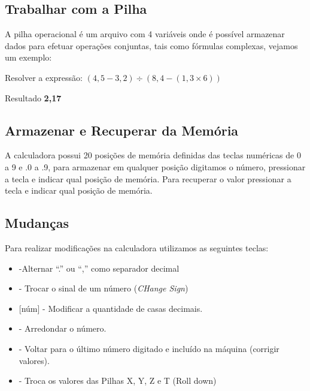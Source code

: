 \subsection*{Trabalhar com a Pilha}
A pilha operacional é um arquivo com 4 variáveis onde é possível armazenar dados para efetuar operações conjuntas, tais como fórmulas complexas, vejamos um exemplo:

Resolver a expressão: $(4,5 - 3,2) \div (8,4 - (1,3 \times 6))$

       \keystroke{$-$}          \keystroke{$\times$} \keystroke{$-$} \keystroke{$\div$}

Resultado \textbf{2,17}

\subsection*{Armazenar e Recuperar da Memória}
A calculadora possui 20 posições de memória definidas das teclas numéricas de 0 a 9 e .0 a .9, para armazenar em qualquer posição digitamos o número, pressionar a tecla  e indicar qual posição de memória. Para recuperar o valor pressionar a tecla  e indicar qual posição de memória.

\subsection*{Mudanças}
Para realizar modificações na calculadora utilizamos as seguintes teclas: \vspace{-1em}
\begin{itemize}
	\item {}  -Alternar “.” ou “,” como separador decimal
	\item {} - Trocar o sinal de um número (\textit{CHange Sign})
	\item {} [núm] - Modificar a quantidade de casas decimais.
	\item {}  - Arredondar o número.
	\item {} - Voltar para o último número digitado e incluído na máquina (corrigir valores).
	\item {} - Troca os valores das Pilhas X, Y, Z e T (Roll down)
\end{itemize}

